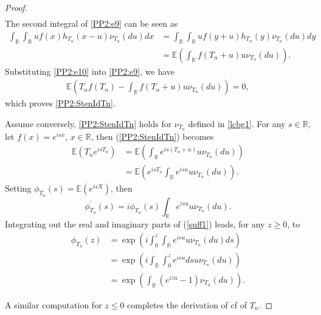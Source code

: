 \documentclass[12pt, a4paper,reqno]{amsart}
\theoremstyle{definition}
\theoremstyle{myremark}
\numberwithin{equation}{section}
\begin{document}
\begin{proof}
\begin{align}
	\end{align}
	\noindent
	The second integral of \eqref{PP2:e9} can be seen as
	\begin{align}
	\nonumber \int_{\mathbb R}\int_{\mathbb R}uf(x)h_{T_n}(x-u)\nu_{T_n}(du)dx&=\int_{\mathbb R}\int_{\mathbb R}uf(y+u)h_{T_n}(y)\nu_{T_n}(du)dy\\ 
	&=\mathbb{E}\left(\int_{\mathbb R}f(T_n+u)u\nu_{T_n}(du)\right).\label{PP2:e10}
	\end{align}
	\noindent
	Substituting \eqref{PP2:e10} into \eqref{PP2:e9}, we have
	\begin{align*}
	\mathbb{E}\left(T_nf(T_n)-\displaystyle\int_{\mathbb{R}}f(T_n+u)u\nu_{T_n}(du) \right)=0,
	\end{align*}
	\noindent
	which proves \eqref{PP2:StenIdTn}.
	
	\noindent
	Assume conversely, \eqref{PP2:StenIdTn} holds for $\nu_{T_n}$ defined in \eqref{lcbg1}. For any $s \in \mathbb{R}$, let $f(x)=e^{isx}$, $x\in \mathbb{R}$, then (\ref{PP2:StenIdTn}) becomes
	\begin{align*}
	\mathbb{E}\left(T_ne^{isT_n}\right) &= \mathbb{E}\left(\int_{\mathbb R}e^{is(T_n+u)}u\nu_{T_n}(du)\right)\\
	&=\mathbb{E}\left(e^{isT_n}\int_{\mathbb R}e^{isu}u\nu_{T_n}(du)\right).
	\end{align*}
	\noindent
	Setting $\phi_{T_n}(s)=\mathbb{E}(e^{isX})$, then
	\begin{equation}\label{suff1}
	\phi_{T_n}^{\prime}(s)=i\phi_{T_n}(s)\int_{\mathbb R}e^{isu}u\nu_{T_n}(du).
	\end{equation}
	\noindent
	Integrating out the real and imaginary parts of (\ref{suff1}) leads, for any $z\geq 0$, to
	\begin{align*}
	\phi_{T_n}(z)&=\exp \left(i\int_{0}^{z}\int_{\mathbb R}e^{isu}u\nu_{T_n}(du)ds  \right)\\
	&=\exp\left(i\int_{\mathbb R}\int_{0}^{z}e^{isu}dsu\nu_{T_n}(du)  \right)\\
	&=\exp\left(\int_{\mathbb R}(e^{izu}-1)\nu_{T_n}(du)  \right).
	\end{align*}
	
	\noindent
	A similar computation for $z\leq0$ completes the derivation of cf of $T_n$. 
\end{proof}

\vspace*{-.7cm}
\end{document}
